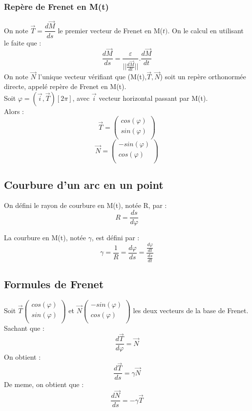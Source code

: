 \subsubsection{Repère de Frenet en M(t)}
On note $\overrightarrow{T} = \dfrac{d\overrightarrow{M}}{ds}$ le premier vecteur de Frenet en M($t)$. On le calcul en utilisant le faite que : 
$$\dfrac{d\overrightarrow{M}}{ds} = \dfrac{\varepsilon}{||\frac{d\overrightarrow{M}}{dt}||}.\dfrac{d\overrightarrow{M}}{dt}$$
On note $\overrightarrow{N}$ l'unique vecteur vérifiant que (M(t),$\overrightarrow{T},\overrightarrow{N}$) soit un repère orthonormée directe, appelé repère de Frenet en M(t).\\
Soit $\varphi =(\overrightarrow{i},\overrightarrow{T}) [2\pi]$, avec $\overrightarrow{i}$ vecteur horizontal passant par M(t).\\
Alors : 
$$\overrightarrow{T} = \begin{pmatrix}
  cos(\varphi)\\
  sin(\varphi)\\
\end{pmatrix}$$
$$\overrightarrow{N} = \begin{pmatrix}
  -sin(\varphi)\\
  cos(\varphi)\\
\end{pmatrix}$$
\subsection{Courbure d'un arc en un point}
\begin{de}
On défini le rayon de courbure en M(t), notée R, par : 
$$R = \dfrac{ds}{d\varphi}$$
\end{de}
\begin{de}
La courbure en M(t), notée $\gamma$, est défini par : 
$$\gamma = \dfrac{1}{R} = \dfrac{d\varphi}{ds} = \dfrac{\frac{d\varphi}{dt}}{\frac{ds}{dt}}$$
\end{de}
\subsection{Formules de Frenet}
Soit $\overrightarrow{T}\begin{pmatrix}
  cos(\varphi)\\
  sin(\varphi)\\
\end{pmatrix}$ et $\overrightarrow{N}\begin{pmatrix}
  -sin(\varphi)\\
  cos(\varphi)\\
\end{pmatrix}$ les deux vecteurs de la base de Frenet.\\
Sachant que : 
$$\dfrac{d\overrightarrow{T}}{d\varphi} = \overrightarrow{N}$$
On obtient : 
$$\dfrac{d\overrightarrow{T}}{ds} = \gamma \overrightarrow{N}$$
De meme, on obtient que : 
$$\dfrac{d\overrightarrow{N}}{ds} = -\gamma \overrightarrow{T}$$
